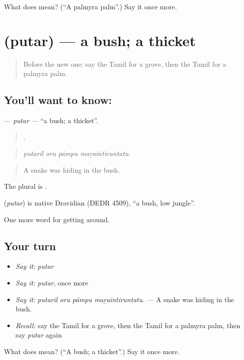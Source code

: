 \begin{tcolorbox}[breakable,colback=teal!4,colframe=teal!35!black,title={Before you move on}]
What does  mean? (\textquotedblleft{}A palmyra palm\textquotedblright{}.) Say it once more.
\end{tcolorbox}
\section[\texorpdfstring{\ta{புதர்} (putar)}{புதர் (putar)}]{ (putar) — a bush; a thicket}

\label{lesson:TA-C434-putar}



\begin{quote}
Before the new one: say the Tamil for a grove, then the Tamil for a palmyra palm.
\end{quote}

\subsection*{You'll want to know: }
\textbf{} — \emph{putar} — \textquotedblleft{}a bush; a thicket\textquotedblright{}.

\begin{quote}
   .
\end{quote}

\begin{quote}
\emph{putaril oru pāmpu maṟaintiruntatu.}
\end{quote}

\begin{quote}
A snake was hiding in the bush.
\end{quote}

The plural is .

\begin{cousinweb}
\textbf{} (\emph{putar}) is native Dravidian (DEDR 4509), \textquotedblleft{}a bush, low jungle\textquotedblright{}.
\end{cousinweb}

\begin{grammarlens}[title={What you've built}]
One more word for getting around.
\end{grammarlens}

\subsection*{Your turn}
\begin{itemize}
\raggedright
  \item \emph{Say it:} \emph{putar}
  \item \emph{Say it:} \emph{putar}, once more
  \item \emph{Say it:} \emph{putaril oru pāmpu maṟaintiruntatu.} — A snake was hiding in the bush.
  \item \emph{Recall:} say the Tamil for a grove, then the Tamil for a palmyra palm, then say \emph{putar} again
\end{itemize}

\begin{tcolorbox}[breakable,colback=teal!4,colframe=teal!35!black,title={Before you move on}]
What does  mean? (\textquotedblleft{}A bush; a thicket\textquotedblright{}.) Say it once more.
\end{tcolorbox}

